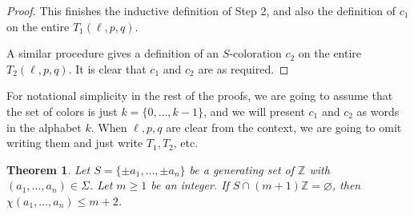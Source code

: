 \documentclass[11pt]{amsart}
\newtheorem{theorem}{Theorem}[section]
\theoremstyle{definition}
\def\Z{\mathbb{Z}}
\def\Z{\mathbb{Z}}
\begin{document}
\begin{proof}
This finishes the inductive definition of Step 2, and also the definition of $c_1$ on the entire $T_1(\ell, p, q)$.

A similar procedure gives a definition of an $S$-coloration $c_2$ on the entire $T_2(\ell, p, q)$. It is clear that $c_1$ and $c_2$ are as required.
\end{proof}


For notational simplicity in the rest of the proofs, we are going to assume that the set of colors is just $k=\{0, \dots, k-1\}$, and we will present $c_1$ and $c_2$ as words in the alphabet $k$. When $\ell, p, q$ are clear from the context, we are going to omit writing them and just write $T_1, T_2$, etc.

\begin{theorem} \label{thm:cong} Let $S=\{\pm a_1, \dots, \pm a_n\}$ be a generating set of $\Z$ with $(a_1, \dots, a_n)\in \Sigma$. Let $m\geq 1$ be an integer. If $S\cap (m+1)\Z=\varnothing$, then $\chi(a_1, \dots, a_n)\leq m+2$.
\end{theorem}
\end{document}
